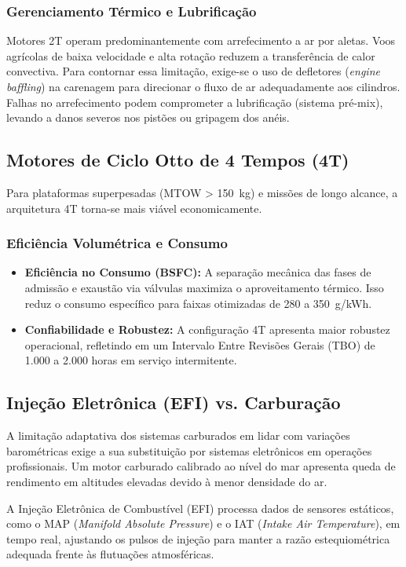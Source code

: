 \documentclass[a4paper,12pt]{article}
\begin{document}
\subsubsection{Gerenciamento Térmico e Lubrificação}
Motores 2T operam predominantemente com arrefecimento a ar por aletas. Voos agrícolas de baixa velocidade e alta rotação reduzem a transferência de calor convectiva. Para contornar essa limitação, exige-se o uso de defletores (\textit{engine baffling}) na carenagem para direcionar o fluxo de ar adequadamente aos cilindros. Falhas no arrefecimento podem comprometer a lubrificação (sistema pré-mix), levando a danos severos nos pistões ou gripagem dos anéis.

\subsection{Motores de Ciclo Otto de 4 Tempos (4T)}
Para plataformas superpesadas (MTOW > \SI{150}{kg}) e missões de longo alcance, a arquitetura 4T torna-se mais viável economicamente.

\subsubsection{Eficiência Volumétrica e Consumo}
\begin{itemize}
    \item \textbf{Eficiência no Consumo (BSFC):} A separação mecânica das fases de admissão e exaustão via válvulas maximiza o aproveitamento térmico. Isso reduz o consumo específico para faixas otimizadas de 280 a \SI{350}{g/kWh}.
    \item \textbf{Confiabilidade e Robustez:} A configuração 4T apresenta maior robustez operacional, refletindo em um Intervalo Entre Revisões Gerais (TBO) de 1.000 a 2.000 horas em serviço intermitente.
\end{itemize}

\subsection{Injeção Eletrônica (EFI) vs. Carburação}
A limitação adaptativa dos sistemas carburados em lidar com variações barométricas exige a sua substituição por sistemas eletrônicos em operações profissionais. Um motor carburado calibrado ao nível do mar apresenta queda de rendimento em altitudes elevadas devido à menor densidade do ar.

A Injeção Eletrônica de Combustível (EFI) processa dados de sensores estáticos, como o MAP (\textit{Manifold Absolute Pressure}) e o IAT (\textit{Intake Air Temperature}), em tempo real, ajustando os pulsos de injeção para manter a razão estequiométrica adequada frente às flutuações atmosféricas.
\end{document}
